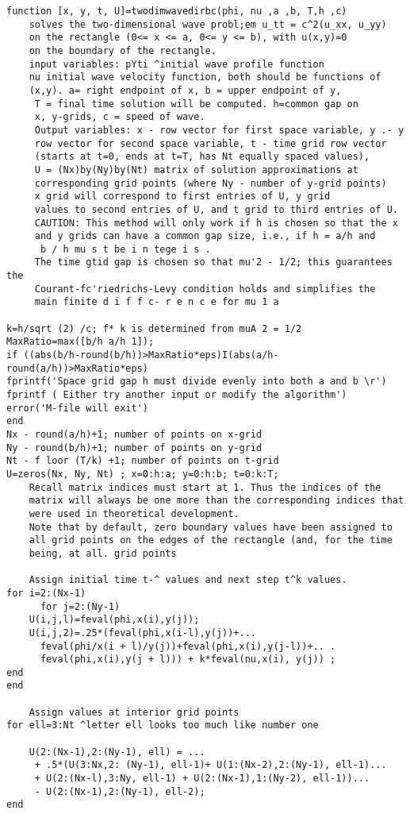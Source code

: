 \documentclass[../main.tex]{subfiles}
\begin{document}
\begin{lstlisting}[numbers=none] 
 function [x, y, t, U]=twodimwavedirbc(phi, nu ,a ,b, T,h ,c)
 	solves the two-dimensional wave probl;em u_tt = c^2(u_xx, u_yy)
 	on the rectangle (0<= x <= a, 0<= y <= b), with u(x,y)=0
 	on the boundary of the rectangle. 
	input variables: pYti ^initial wave profile function 
	nu initial wave velocity function, both should be functions of 
	(x,y). a= right endpoint of x, b = upper endpoint of y, 
	 T = final time solution will be computed. h=common gap on 
	 x, y-grids, c = speed of wave. 
	 Output variables: x - row vector for first space variable, y .- y
	 row vector for second space variable, t - time grid row vector 
	 (starts at t=0, ends at t=T, has Nt equally spaced values), 
	 U = (Nx)by(Ny)by(Nt) matrix of solution approximations at 
	 corresponding grid points (where Ny - number of y-grid points) 
	 x grid will correspond to first entries of U, y grid 
	 values to second entries of U, and t grid to third entries of U. 
	 CAUTION: This method will only work if h is chosen so that the x 
	 and y grids can have a common gap size, i.e., if h = a/h and 
	  b / h mu s t be i n tege i s . 
	 The time gtid gap is chosen so that mu'2 - 1/2; this guarantees the 
	 Courant-fc'riedrichs-Levy condition holds and simplifies the 
	 main finite d i f f c- r e n c e for mu 1 a
	 
k=h/sqrt (2) /c; f* k is determined from muA 2 = 1/2 
MaxRatio=max([b/h a/h 1]); 
if ((abs(b/h-round(b/h))>MaxRatio*eps)I(abs(a/h-
round(a/h))>MaxRatio*eps)  
fprintf('Space grid gap h must divide evenly into both a and b \r') 
fprintf ( Either try another input or modify the algorithm') 
error('M-file will exit') 
end 
Nx - round(a/h)+1; number of points on x-grid 
Ny - round(b/h)+1; number of points on y-grid 
Nt - f loor (T/k) +1; number of points on t-grid 
U=zeros(Nx, Ny, Nt) ; x=0:h:a; y=0:h:b; t=0:k:T;
	Recall matrix indices must start at 1. Thus the indices of the 
	matrix will always be one more than the corresponding indices that 
	were used in theoretical development. 
	Note that by default, zero boundary values have been assigned to 
	all grid points on the edges of the rectangle (and, for the time 
	being, at all. grid points
	
	Assign initial time t-^ values and next step t^k values. 
for i=2:(Nx-1) 
	  for j=2:(Ny-1) 
	U(i,j,l)=feval(phi,x(i),y(j)); 
	U(i,j,2)=.25*(feval(phi,x(i-l),y(j))+... 
	  feval(phi/x(i + l)/y(j))+feval(phi,x(i),y(j-l))+.. . 
	  feval(phi,x(i),y(j + l))) + k*feval(nu,x(i), y(j)) ; 
end 
end 

	Assign values at interior grid points 
for ell=3:Nt ^letter ell looks too much like number one 

	U(2:(Nx-1),2:(Ny-1), ell) = ... 
	 + .5*(U(3:Nx,2: (Ny-1), ell-1)+ U(1:(Nx-2),2:(Ny-1), ell-1)... 
	 + U(2:(Nx-l),3:Ny, ell-1) + U(2:(Nx-1),1:(Ny-2), ell-1))... 
	 - U(2:(Nx-1),2:(Ny-1), ell-2); 
end 
\end{lstlisting}
\end{document}
